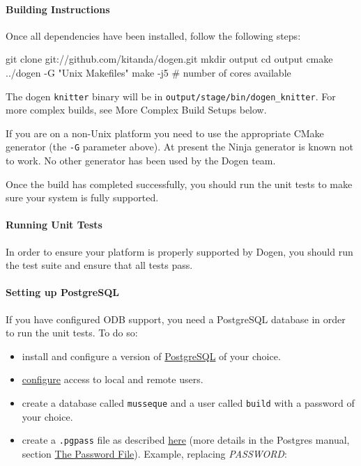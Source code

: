 \documentclass{book}
\begin{document}
\paragraph{Building Instructions}

Once all dependencies have been installed, follow the following steps:

\begin{pseudocode}[backgroundcolor=\color{lightgray}]
git clone git://github.com/kitanda/dogen.git
mkdir output
cd output
cmake ../dogen -G "Unix Makefiles"
make -j5 # number of cores available
\end{pseudocode}

The dogen \texttt{knitter} binary will be in
\texttt{output/stage/bin/dogen\_knitter}. For more complex builds, see
More Complex Build Setups below.

If you are on a non-Unix platform you need to use the appropriate
CMake generator (the \texttt{-G} parameter above). At present the
Ninja generator is known not to work. No other generator has been used
by the Dogen team.

Once the build has completed successfully, you should run the unit
tests to make sure your system is fully supported.

\paragraph{Running Unit Tests}

In order to ensure your platform is properly supported by Dogen, you
should run the test suite and ensure that all tests pass.

\paragraph{Setting up PostgreSQL}

If you have configured ODB support, you need a PostgreSQL database in
order to run the unit tests. To do so:

\begin{itemize}
\item install and configure a version of
  \href{http://www.postgresql.org/}{PostgreSQL} of your choice.
\item
  \href{http://www.cyberciti.biz/tips/postgres-allow-remote-access-tcp-connection.html}{configure}
  access to local and remote users.
\item create a database called \texttt{musseque} and a user called
  \texttt{build} with a password of your choice.
\item create a \texttt{.pgpass} file as described
  \href{http://wiki.postgresql.org/wiki/Pgpass}{here} (more details in
  the Postgres manual, section
  \href{http://www.postgresql.org/docs/current/static/libpq-pgpass.html}{The
    Password File}). Example, replacing \emph{PASSWORD}:
\end{itemize}
\end{document}
